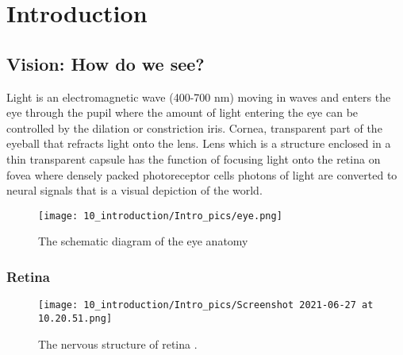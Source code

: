 \chapter{Introduction}
\label{ch:introduction}

\section{Vision: How do we see?}
\label{ch:intro:sec:Biobackground}
Light is an electromagnetic wave (400-700 nm) moving in waves and enters the eye through the pupil where the amount of light entering the eye can be controlled by the dilation or constriction iris. Cornea, transparent part of the eyeball that refracts light onto the lens. Lens which is a structure enclosed in a thin transparent capsule has the function of focusing light onto the retina on fovea where densely packed photoreceptor cells photons of light are converted to neural signals that is a visual depiction of the world. \cite{schwartz_2012}

\begin{figure}[H]
\centering
\texttt{[image: 10\_introduction/Intro\_pics/eye.png]}
\caption{The schematic diagram of the eye anatomy \cite{annemariehelmenstine} }
\label{fig:Retina structure}
\end{figure}

\subsection{Retina}

\begin{figure}[H]
\centering
\texttt{[image: 10\_introduction/Intro\_pics/Screenshot 2021-06-27 at 10.20.51.png]}
\caption{The nervous structure of retina .\cite{ragelle2020organ} }
\label{fig:Retina structure}
\end{figure}

